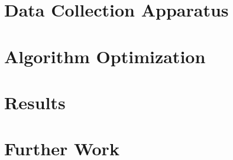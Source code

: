     \chapter{Data Collection Apparatus}

    \chapter{Algorithm Optimization}

    \chapter{Results}

    \chapter{Further Work}
